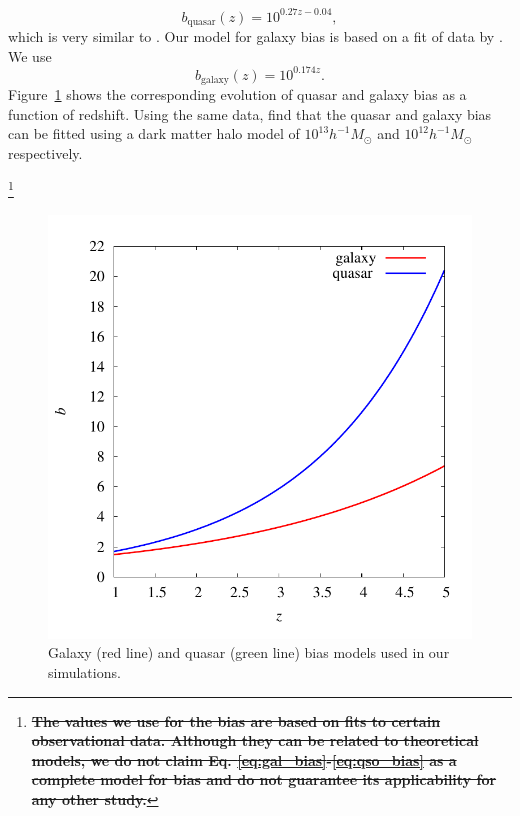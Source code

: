 \documentclass[numberedappendix]{emulateapj}
\newcommand\ALc[1]{{\color{red} \bf #1}} %
\newcommand\Cc[1]{{\color{blue} \bf #1}} %
\begin{document}
  \begin{equation}
    \label{eq:gal_bias}
    b_{\mathrm{quasar}}(z)=10^{0.27z-0.04},
  \end{equation}
which is very similar to \citet{2012MNRAS.422..106P}. Our model for galaxy bias is based on a fit of data by \citet{2005A&A...442..801M,1998ApJ...492..428S,2006ApJ...637..631K}. We use
  \begin{equation}
    \label{eq:qso_bias}
    b_{\mathrm{galaxy}}(z)=10^{0.174z}.
  \end{equation}
Figure~\ref{fig:bias} shows the corresponding evolution of quasar and galaxy bias as a function of redshift. Using the same data, \citet{2008ApJ...678..627B} find that the quasar and galaxy bias can be fitted using a dark matter halo model of  $10^{13}h^{-1}M_{\odot}$ and $10^{12}h^{-1} M_{\odot}$ respectively. {\footnote{\ALc{\sout{The values we use for the bias are based on fits to certain observational data. Although they can be related to theoretical models, we do not claim Eq. \ref{eq:gal_bias}-\ref{eq:qso_bias} as a complete model for bias and do not guarantee its applicability for any other study.}}}


\begin{figure}[h]
\centering
\includegraphics[width = .4\textwidth ]{bias}
\caption{Galaxy (red line) and quasar (green line) bias models used in our simulations.}
\label{fig:bias}
\end{figure}

}
\end{document}
